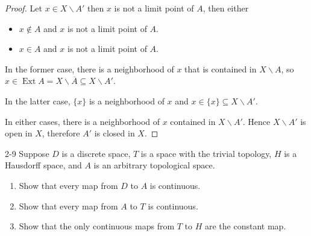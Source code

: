 \begin{proof}
	Let $x\in X\smallsetminus A'$ then $x$ is not a limit point of $A$, then either
	\begin{itemize}
		\item $x\notin A$ and $x$ is not a limit point of $A$.
		\item $x\in A$ and $x$ is not a limit point of $A$.
	\end{itemize}

	In the former case, there is a neighborhood of $x$ that is contained in $X\smallsetminus A$, so $x\in \operatorname{Ext}A = X\smallsetminus\overline{A}\subseteq X\smallsetminus A'$.

	In the latter case, $\{ x \}$ is a neighborhood of $x$ and $x\in\{ x \}\subseteq X\smallsetminus A'$.

	In either cases, there is a neighborhood of $x$ contained in $X\smallsetminus A'$. Hence $X\smallsetminus A'$ is open in $X$, therefore $A'$ is closed in $X$.
\end{proof}

\begin{problem}{2-9}\label{problem:2-9}
Suppose $D$ is a discrete space, $T$ is a space with the trivial topology, $H$ is a Hausdorff space, and $A$ is an arbitrary topological space.
\begin{enumerate}[label={(\alph*)}]
	\item Show that every map from $D$ to $A$ is continuous.
	\item Show that every map from $A$ to $T$ is continuous.
	\item Show that the only continuous maps from $T$ to $H$ are the constant map.
\end{enumerate}
\end{problem}

